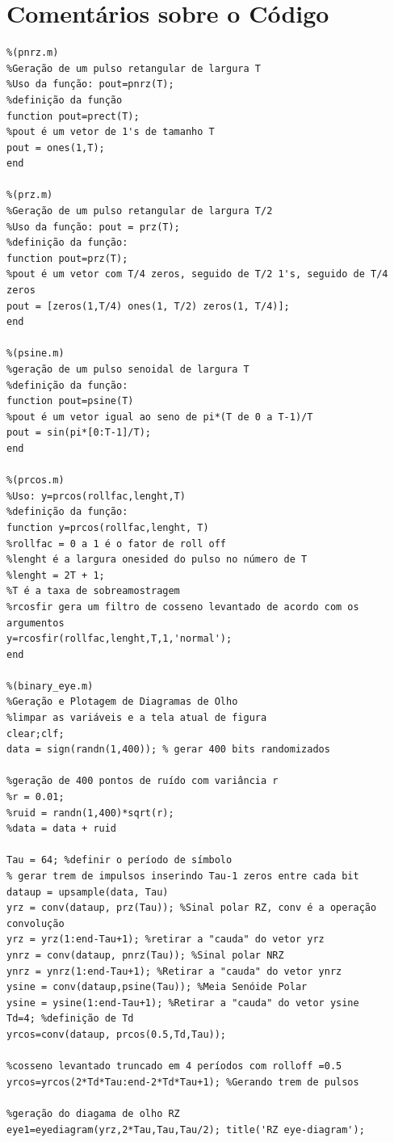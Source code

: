 \section{Comentários sobre o Código}
\begin{verbatim}
%(pnrz.m)
%Geração de um pulso retangular de largura T
%Uso da função: pout=pnrz(T);
%definição da função
function pout=prect(T);
%pout é um vetor de 1's de tamanho T
pout = ones(1,T);
end

%(prz.m)
%Geração de um pulso retangular de largura T/2
%Uso da função: pout = prz(T);
%definição da função:
function pout=prz(T);
%pout é um vetor com T/4 zeros, seguido de T/2 1's, seguido de T/4 zeros
pout = [zeros(1,T/4) ones(1, T/2) zeros(1, T/4)];
end

%(psine.m)
%geração de um pulso senoidal de largura T
%definição da função:
function pout=psine(T)
%pout é um vetor igual ao seno de pi*(T de 0 a T-1)/T
pout = sin(pi*[0:T-1]/T);
end

%(prcos.m)
%Uso: y=prcos(rollfac,lenght,T)
%definição da função:
function y=prcos(rollfac,lenght, T)
%rollfac = 0 a 1 é o fator de roll off
%lenght é a largura onesided do pulso no número de T
%lenght = 2T + 1;
%T é a taxa de sobreamostragem
%rcosfir gera um filtro de cosseno levantado de acordo com os argumentos
y=rcosfir(rollfac,lenght,T,1,'normal');
end

%(binary_eye.m)
%Geração e Plotagem de Diagramas de Olho
%limpar as variáveis e a tela atual de figura
clear;clf;
data = sign(randn(1,400)); % gerar 400 bits randomizados

%geração de 400 pontos de ruído com variância r
%r = 0.01;
%ruid = randn(1,400)*sqrt(r);
%data = data + ruid

Tau = 64; %definir o período de símbolo
% gerar trem de impulsos inserindo Tau-1 zeros entre cada bit
dataup = upsample(data, Tau) 
yrz = conv(dataup, prz(Tau)); %Sinal polar RZ, conv é a operação convolução
yrz = yrz(1:end-Tau+1); %retirar a "cauda" do vetor yrz
ynrz = conv(dataup, pnrz(Tau)); %Sinal polar NRZ
ynrz = ynrz(1:end-Tau+1); %Retirar a "cauda" do vetor ynrz
ysine = conv(dataup,psine(Tau)); %Meia Senóide Polar
ysine = ysine(1:end-Tau+1); %Retirar a "cauda" do vetor ysine
Td=4; %definição de Td
yrcos=conv(dataup, prcos(0.5,Td,Tau)); 

%cosseno levantado truncado em 4 períodos com rolloff =0.5
yrcos=yrcos(2*Td*Tau:end-2*Td*Tau+1); %Gerando trem de pulsos

%geração do diagama de olho RZ
eye1=eyediagram(yrz,2*Tau,Tau,Tau/2); title('RZ eye-diagram'); 


\end{verbatim}
